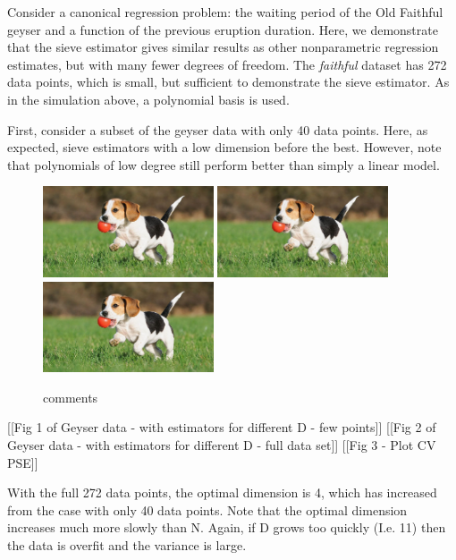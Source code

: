 \documentclass[12pt]{article}  %
\begin{document}
Consider a canonical regression problem: the waiting period of the Old Faithful geyser and a function  of the previous eruption duration.  Here, we demonstrate that the sieve estimator gives similar results as other nonparametric regression estimates, but with many fewer degrees of freedom. The \textit{faithful} dataset has 272 data points, which is small, but sufficient to demonstrate the sieve estimator. As in the simulation above, a polynomial basis is used.

First, consider a subset of the geyser data with only 40 data points.  Here, as expected, sieve estimators with a low dimension before the best. However, note that polynomials of low degree still perform better than simply a linear model.
\begin{figure}[h]
    \centering
    \includegraphics[width=0.45\textwidth]{pup.jpg}
    \includegraphics[width=0.45\textwidth]{pup.jpg}\\
    \includegraphics[width=0.45\textwidth]{pup.jpg}\\
    \caption{comments}
    \label{fig:pup}{}
\end{figure}


[[Fig 1 of Geyser data - with estimators for different D - few points]]
[[Fig 2 of Geyser data - with estimators for different D - full data set]]
[[Fig 3 - Plot CV PSE]]

With the full 272 data points, the optimal dimension is 4, which has increased from the case with only 40 data points. Note that the optimal dimension increases much more slowly than N. Again, if D grows too quickly (I.e. 11) then the data is overfit and the variance is large. 
\end{document}
